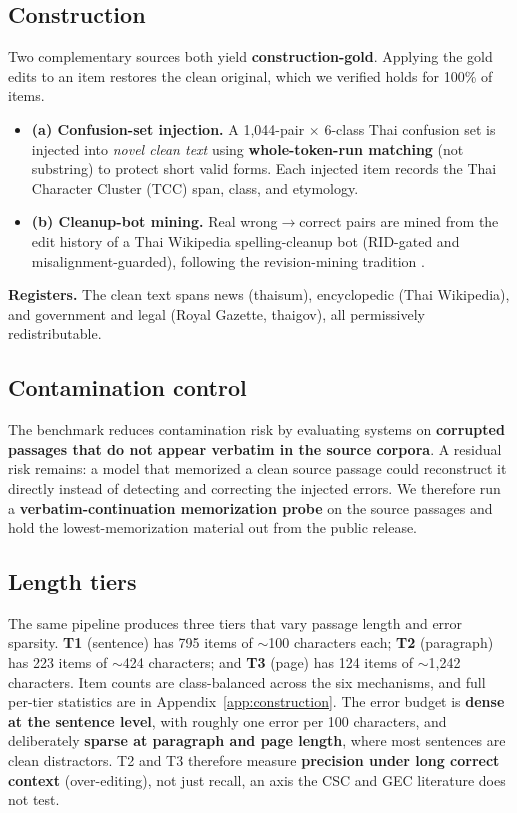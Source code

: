 \documentclass[11pt]{article}
\begin{document}
\subsection{Construction}
Two complementary sources both yield \textbf{construction-gold}. Applying the gold edits to an
item restores the clean original, which we verified holds for 100\% of items.
\begin{itemize}\itemsep2pt
\item \textbf{(a) Confusion-set injection.} A 1{,}044-pair $\times$ 6-class Thai confusion set
is injected into \emph{novel clean text} using \textbf{whole-token-run matching} (not
substring) to protect short valid forms. Each injected item records the Thai Character Cluster
(TCC) span, class, and etymology.
\item \textbf{(b) Cleanup-bot mining.} Real wrong$\to$correct pairs are mined from the edit
history of a Thai Wikipedia spelling-cleanup bot (RID-gated and misalignment-guarded),
following the revision-mining tradition
\citep{tanaka-etal-2020-building,grundkiewicz-junczysdowmunt-2014-wiked}.
\end{itemize}
\noindent\textbf{Registers.} The clean text spans news (thaisum), encyclopedic (Thai
Wikipedia), and government and legal (Royal Gazette, thaigov), all permissively
redistributable.

\subsection{Contamination control}
The benchmark reduces contamination risk by evaluating systems on \textbf{corrupted passages
that do not appear verbatim in the source corpora}. A residual risk remains: a model that
memorized a clean source passage could reconstruct it directly instead of detecting and
correcting the injected errors. We therefore run a \textbf{verbatim-continuation memorization
probe} on the source passages and hold the lowest-memorization material out from the public
release.

\subsection{Length tiers}
\label{sec:tiers}
The same pipeline produces three tiers that vary passage length and error sparsity.
\textbf{T1} (sentence) has 795 items of $\sim$100 characters each; \textbf{T2} (paragraph) has
223 items of $\sim$424 characters; and \textbf{T3} (page) has 124 items of $\sim$1{,}242
characters. Item counts are class-balanced across the six mechanisms, and full per-tier
statistics are in Appendix~\ref{app:construction}. The error budget is \textbf{dense at the
sentence level}, with roughly one error per 100 characters, and deliberately \textbf{sparse at
paragraph and page length}, where most sentences are clean distractors. T2 and T3 therefore
measure \textbf{precision under long correct context} (over-editing), not just recall, an axis
the CSC and GEC literature does not test.
\end{document}
